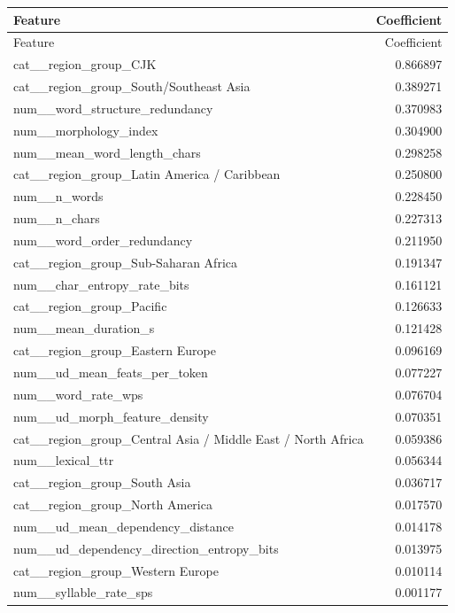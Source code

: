 \begin{longtable}{lr}\toprule Feature & Coefficient\\ \midrule\endfirsthead\toprule Feature & Coefficient\\ \midrule\endhead
cat\_\_region\_group\_CJK & 0.866897\\
cat\_\_region\_group\_South/Southeast Asia & 0.389271\\
num\_\_word\_structure\_redundancy & 0.370983\\
num\_\_morphology\_index & 0.304900\\
num\_\_mean\_word\_length\_chars & 0.298258\\
cat\_\_region\_group\_Latin America / Caribbean & 0.250800\\
num\_\_n\_words & 0.228450\\
num\_\_n\_chars & 0.227313\\
num\_\_word\_order\_redundancy & 0.211950\\
cat\_\_region\_group\_Sub-Saharan Africa & 0.191347\\
num\_\_char\_entropy\_rate\_bits & 0.161121\\
cat\_\_region\_group\_Pacific & 0.126633\\
num\_\_mean\_duration\_s & 0.121428\\
cat\_\_region\_group\_Eastern Europe & 0.096169\\
num\_\_ud\_mean\_feats\_per\_token & 0.077227\\
num\_\_word\_rate\_wps & 0.076704\\
num\_\_ud\_morph\_feature\_density & 0.070351\\
cat\_\_region\_group\_Central Asia / Middle East / North Africa & 0.059386\\
num\_\_lexical\_ttr & 0.056344\\
cat\_\_region\_group\_South Asia & 0.036717\\
cat\_\_region\_group\_North America & 0.017570\\
num\_\_ud\_mean\_dependency\_distance & 0.014178\\
num\_\_ud\_dependency\_direction\_entropy\_bits & 0.013975\\
cat\_\_region\_group\_Western Europe & 0.010114\\
num\_\_syllable\_rate\_sps & 0.001177\\
\bottomrule\end{longtable}
